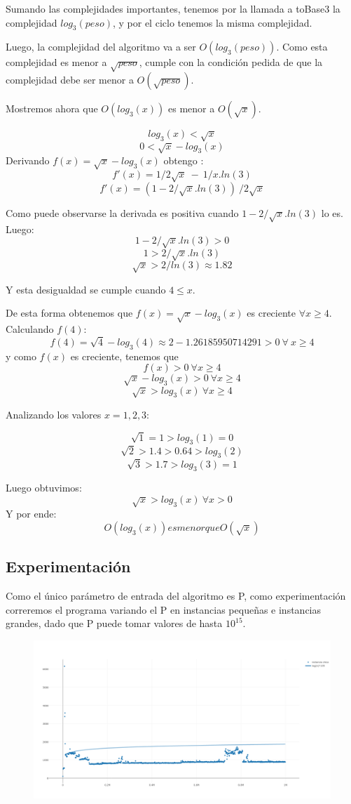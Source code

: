 Sumando las complejidades importantes, tenemos por la llamada a toBase3 la complejidad $log_3(peso)$, y por el ciclo tenemos la misma complejidad.

Luego, la complejidad del algoritmo va a ser $O(log_3(peso))$. Como esta complejidad es menor a $\sqrt{peso}$, cumple con la condición pedida de que la complejidad debe ser menor a $O(\sqrt{peso})$.

\newpage
Mostremos ahora que $O(log_3(x))$ es menor a $O(\sqrt{x})$.

\[
log_3(x) < \sqrt{x}
\] \[
0 < \sqrt{x} - log_3(x)
\]
Derivando $f(x) = \sqrt{x} - log_3(x)$ obtengo :
\[
f'(x) = 1/2\sqrt{x} \ - \ 1/x.ln(3)
\] \[
f'(x) = (1 - 2/\sqrt{x}.ln(3)) \ /2\sqrt{x}
\]

Como puede observarse la derivada es positiva cuando $1 - 2/\sqrt{x}.ln(3)$ lo es. Luego:
\[
1 - 2/\sqrt{x}.ln(3) > 0
\] \[
1 > 2/\sqrt{x}.ln(3)
\] \[
\sqrt{x} > 2/ln(3) \approx 1.82
\]

Y esta desigualdad se cumple cuando $4 \leq x$.
 
De esta forma obtenemos que $f(x) = \sqrt{x} - log_3(x)$ es creciente $\forall x \geq 4$. Calculando $f(4)$:
\[
f(4) = \sqrt{4} - log_3(4) \approx 2 - 1.26185950714291 > 0 \ \forall \ x \geq 4
\]
y como $f(x)$ es creciente, tenemos que 
\[
f(x) > 0 \ \forall x \geq 4
\] \[ 
\sqrt{x} - log_3(x) > 0 \ \forall x \geq 4
\] \[
\sqrt{x} > log_3(x)  \ \forall x \geq 4
\]

Analizando los valores $x = 1,2,3$:

\[
\sqrt{1} = 1 > log_3(1) = 0
\] \[
\sqrt{2} > 1.4 > 0.64 > log_3(2)
\] \[
\sqrt{3} > 1.7 > log_3(3) = 1
\] 

Luego obtuvimos:
\[
\sqrt{x} > log_3(x)  \ \forall x > 0
\]
Y por ende:
\[ 
O(log_3(x)) es menor que O(\sqrt{x})
\]


 

\newpage
\subsection{Experimentación}

Como el único parámetro de entrada del algoritmo es P, como experimentación correremos el programa variando el P en instancias pequeñas e instancias grandes, dado que P puede tomar valores de hasta $10^{15}$.

\begin{figure}[H]
    \centering
    \includegraphics[width=\textwidth]{./imagenes/ej2chico.png}
\end{figure}

